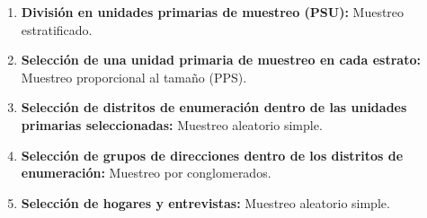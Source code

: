 \documentclass[12pt, letterpaper]{article}
\begin{document}
            \begin{enumerate}
                \item \textbf{División en unidades primarias de muestreo (PSU):} Muestreo estratificado.

                \item \textbf{Selección de una unidad primaria de muestreo en cada estrato:} Muestreo proporcional al tamaño (PPS).

                \item \textbf{Selección de distritos de enumeración dentro de las unidades primarias seleccionadas:} Muestreo aleatorio simple.

                \item \textbf{Selección de grupos de direcciones dentro de los distritos de enumeración:} Muestreo por conglomerados.

                \item \textbf{Selección de hogares y entrevistas:} Muestreo aleatorio simple.

            \end{enumerate}
\end{document}
